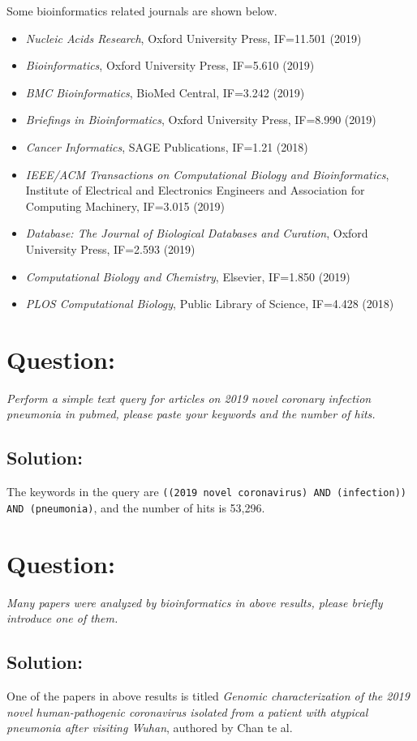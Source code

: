\documentclass[en,black,12pt,normal]{elegantnote}
\newcommand{\upcite}[1]{\textsuperscript{\textsuperscript{\cite{#1}}}}
\begin{document}
Some bioinformatics related journals are shown below.\upcite{wiki:List_of_bioinformatics_journals}
\begin{itemize}
    \item \textit{Nucleic Acids Research}, Oxford University Press, IF=11.501 (2019)
    \item \textit{Bioinformatics}, Oxford University Press, IF=5.610 (2019)
    \item \textit{BMC Bioinformatics}, 	BioMed Central, IF=3.242 (2019)
    \item \textit{Briefings in Bioinformatics}, Oxford University Press, IF=8.990 (2019)
    \item \textit{Cancer Informatics}, SAGE Publications, IF=1.21 (2018)
    \item \textit{IEEE/ACM Transactions on Computational Biology and Bioinformatics}, Institute of Electrical and Electronics Engineers and Association for Computing Machinery, IF=3.015 (2019)
    \item \textit{Database: The Journal of Biological Databases and Curation}, Oxford University Press, IF=2.593 (2019)
    \item \textit{Computational Biology and Chemistry}, Elsevier, IF=1.850 (2019)
    \item \textit{PLOS Computational Biology}, Public Library of Science, IF=4.428 (2018)
\end{itemize}

\section{Question:}
\textit{Perform a simple text query for articles on 2019 novel coronary infection pneumonia in pubmed, please paste your keywords and the number of hits.}

\subsection*{Solution:}
The keywords in the query are \texttt{((2019 novel coronavirus) AND (infection)) AND (pneumonia)}, and the number of hits is 53,296.

\section{Question:}
\textit{Many papers were analyzed by bioinformatics in above results, please briefly introduce one of them.}

\subsection*{Solution:}
One of the papers in above results is titled \textit{Genomic characterization of the 2019 novel human-pathogenic coronavirus isolated from a patient with atypical pneumonia after visiting Wuhan},
authored by Chan te al.\upcite{chan2020genomic}
\end{document}
